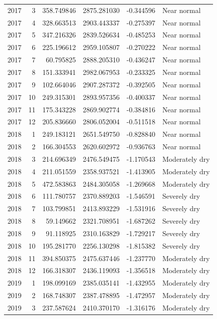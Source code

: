 \begin{tabular}{rrrrrl}
2017 & 3 & 358.749846 & 2875.281030 & -0.344596 & Near normal \\
2017 & 4 & 328.663513 & 2903.443337 & -0.275397 & Near normal \\
2017 & 5 & 347.216326 & 2839.526634 & -0.485253 & Near normal \\
2017 & 6 & 225.196612 & 2959.105807 & -0.270222 & Near normal \\
2017 & 7 & 60.795825 & 2888.205310 & -0.436247 & Near normal \\
2017 & 8 & 151.333941 & 2982.067953 & -0.233325 & Near normal \\
2017 & 9 & 102.664046 & 2907.287372 & -0.392505 & Near normal \\
2017 & 10 & 249.315301 & 2893.957356 & -0.400337 & Near normal \\
2017 & 11 & 175.343228 & 2869.902774 & -0.384816 & Near normal \\
2017 & 12 & 205.836660 & 2806.052004 & -0.511518 & Near normal \\
2018 & 1 & 249.183121 & 2651.549750 & -0.828840 & Near normal \\
2018 & 2 & 166.304553 & 2620.602972 & -0.936763 & Near normal \\
2018 & 3 & 214.696349 & 2476.549475 & -1.170543 & Moderately dry \\
2018 & 4 & 211.051559 & 2358.937521 & -1.413905 & Moderately dry \\
2018 & 5 & 472.583863 & 2484.305058 & -1.269668 & Moderately dry \\
2018 & 6 & 111.780757 & 2370.889203 & -1.546591 & Severely dry \\
2018 & 7 & 103.799851 & 2413.893229 & -1.531916 & Severely dry \\
2018 & 8 & 59.149662 & 2321.708951 & -1.687262 & Severely dry \\
2018 & 9 & 91.118925 & 2310.163829 & -1.729217 & Severely dry \\
2018 & 10 & 195.281770 & 2256.130298 & -1.815382 & Severely dry \\
2018 & 11 & 394.850375 & 2475.637446 & -1.237770 & Moderately dry \\
2018 & 12 & 166.318307 & 2436.119093 & -1.356518 & Moderately dry \\
2019 & 1 & 198.099169 & 2385.035141 & -1.432955 & Moderately dry \\
2019 & 2 & 168.748307 & 2387.478895 & -1.472957 & Moderately dry \\
2019 & 3 & 237.587624 & 2410.370170 & -1.316176 & Moderately dry \\

\end{tabular}
